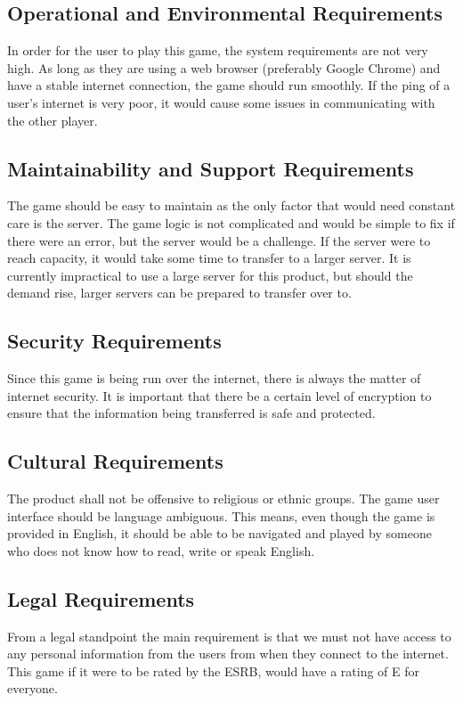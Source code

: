 \documentclass[12pt, titlepage]{article}
\begin{document}
\subsection{Operational and Environmental Requirements}
In order for the user to play this game, the system requirements are not very
high. As long as they are using a web browser (preferably Google Chrome) and
have a stable internet connection, the game should run smoothly. If the ping of
a user's internet is very poor, it would cause some issues in communicating with
the other player.

\subsection{Maintainability and Support Requirements}
The game should be easy to maintain as the only factor that would need constant
care is the server. The game logic is not complicated and would be simple to fix
if there were an error, but the server would be a challenge. If the server were
to reach capacity, it would take some time to transfer to a larger server. It is
currently impractical to use a large server for this product, but should the
demand rise, larger servers can be prepared to transfer over to.

\subsection{Security Requirements}
Since this game is being run over the internet, there is always the matter of
internet security. It is important that there be a certain level of encryption
to ensure that the information being transferred is safe and protected.

\subsection{Cultural Requirements}

The product shall not be offensive to religious or ethnic groups. The game user
interface should be language ambiguous. This means, even though the game is
provided in English, it should be able to be navigated and played by someone who
does not know how to read, write or speak English.

\subsection{Legal Requirements}
From a legal standpoint the main requirement is that we must not have access to
any personal information from the users from when they connect to the internet.
This game if it were to be rated by the ESRB, would have a rating of E for
everyone.
\end{document}
